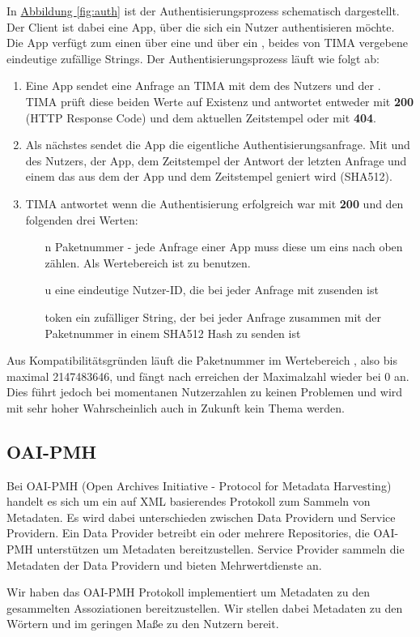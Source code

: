 In \hyperref[fig:auth]{Abbildung \ref*{fig:auth}} ist der Authentisierungsprozess schematisch dargestellt. Der Client ist dabei eine App, über die sich ein Nutzer authentisieren möchte. Die App verfügt zum einen über eine  und über ein , beides von TIMA vergebene eindeutige zufällige Strings. Der Authentisierungsprozess läuft wie folgt ab:
\begin{enumerate}
	\item Eine App sendet eine Anfrage an TIMA mit dem  des Nutzers und der . TIMA prüft diese beiden Werte auf Existenz und antwortet entweder mit \textbf{200} (HTTP Response Code) und dem aktuellen Zeitstempel oder mit \textbf{404}.
	\item Als nächstes sendet die App die eigentliche Authentisierungsanfrage. Mit  und  des Nutzers,  der App, dem Zeitstempel der Antwort der letzten Anfrage und einem  das aus dem  der App und dem Zeitstempel geniert wird (SHA512).
	\item TIMA antwortet wenn die Authentisierung erfolgreich war mit \textbf{200} und den folgenden drei Werten:
	\begin{itemize}
		\item[n] Paketnummer - jede Anfrage einer App muss diese um eins nach oben zählen. Als Wertebereich ist  zu benutzen.
		\item[u] eine eindeutige Nutzer-ID, die bei jeder Anfrage mit zusenden ist
		\item[token] ein zufälliger String, der bei jeder Anfrage zusammen mit der Paketnummer  in einem SHA512 Hash zu senden ist
	\end{itemize}
\end{enumerate}

Aus Kompatibilitätsgründen läuft die Paketnummer im Wertebereich , also bis maximal 2147483646, und fängt nach erreichen der Maximalzahl wieder bei 0 an. Dies führt jedoch bei momentanen Nutzerzahlen zu keinen Problemen und wird mit sehr hoher Wahrscheinlich auch in Zukunft kein Thema werden.

\subsection{OAI-PMH}\label{sec:oai-pmh} %
Bei OAI-PMH (Open Archives Initiative - Protocol for Metadata Harvesting) handelt es sich um ein auf XML basierendes Protokoll zum Sammeln von Metadaten. Es wird dabei unterschieden zwischen Data Providern und Service Providern. Ein Data Provider betreibt ein oder mehrere Repositories, die OAI-PMH unterstützen um Metadaten bereitzustellen. Service Provider sammeln die Metadaten der Data Providern und bieten Mehrwertdienste an.

Wir haben das OAI-PMH Protokoll implementiert um Metadaten zu den gesammelten Assoziationen bereitzustellen. Wir stellen dabei Metadaten zu den Wörtern und im geringen Maße zu den Nutzern bereit.